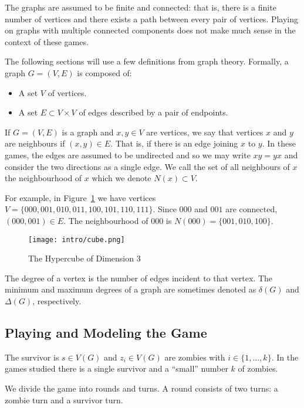 
The graphs are assumed to be finite and connected: that is, there is a finite
number of vertices and there exists a path between every pair of vertices.
Playing on graphs with multiple connected components does not make much sense in the context of these games.

The following sections will use a few definitions from graph theory.
Formally, a graph $G = (V, E)$ is composed of:

\begin{itemize}
\item A set $V$ of vertices.
\item A set $E \subset V \times V$ of edges described by a pair of endpoints.
\end{itemize}

If $G = (V,E)$ is a graph and $x,y \in V$ are vertices, we say that vertices $x$ and $y$ are neighbours if $(x,y) \in E$.
That is, if there is an edge joining $x$ to $y$.
In these games, the edges are assumed to be undirected and so we may write $xy = yx$
and consider the two directions as a single edge.
We call the set of all neighbours of $x$ the neighbourhood of $x$ which we denote $N(x) \subset V$.

For example, in Figure~\ref{fig:hyper-cube} we have vertices $V = \{ 000, 001, 010, 011, 100, 101, 110, 111 \}$.
Since $000$ and $001$ are connected, $(000, 001) \in E$.
The neighbourhood of $000$ is $N(000) = \{ 001, 010, 100 \}$.

\begin{figure}
\centering
\texttt{[image: intro/cube.png]}
\caption{The Hypercube of Dimension 3 \label{fig:hyper-cube}}
\end{figure}

The degree of a vertex is the number of edges incident to that vertex. The minimum and maximum
degrees of a graph are sometimes denoted as $\delta(G)$ and $\Delta(G)$, respectively.

\subsection{Playing and Modeling the Game}

The survivor is $s \in V(G)$ and $z_i \in V(G)$ are zombies with $i \in \{1, \dots, k\}$.
In the games studied there is a single survivor and a ``small'' number $k$ of zombies.

We divide the game into rounds and turns. A round consists of two turns:
a zombie turn and a survivor turn.

